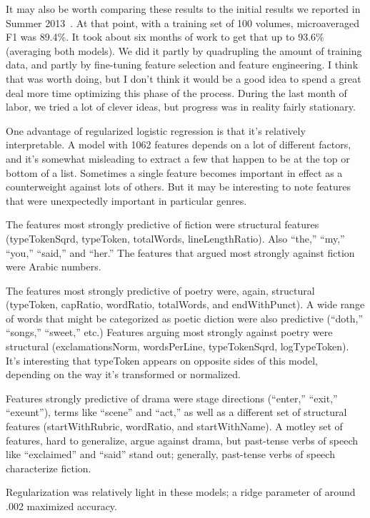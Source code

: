 \documentclass[paper=a4, fontsize=12pt]{scrartcl}
\numberwithin{equation}{section}		%
\numberwithin{figure}{section}			%
\numberwithin{table}{section}				%
\begin{document}
It may also be worth comparing these results to the initial results we reported in Summer 2013~\cite{underwood:mutable}. At that point, with a training set of 100 volumes, microaveraged F1 was 89.4\%. It took about six months of work to get that up to 93.6\% (averaging both models). We did it partly by quadrupling the amount of training data, and partly by fine-tuning feature selection and feature engineering. I think that was worth doing, but I don't think it would be a good idea to spend a great deal more time optimizing this phase of the process. During the last month of labor, we tried a lot of clever ideas, but progress was in reality fairly stationary.

One advantage of regularized logistic regression is that it's relatively interpretable. A model with 1062 features depends on a lot of different factors, and it's somewhat misleading to extract a few that happen to be at the top or bottom of a list. Sometimes a single feature becomes important in effect as a counterweight against lots of others. But it may be interesting to note features that were unexpectedly important in particular genres.

The features most strongly predictive of fiction were structural features (typeTokenSqrd, typeToken, totalWords, lineLengthRatio). Also ``the,'' ``my,'' ``you,'' ``said,'' and ``her.'' The features that argued most strongly against fiction were Arabic numbers.

The features most strongly predictive of poetry were, again, structural (typeToken, capRatio, wordRatio, totalWords, and endWithPunct). A wide range of words that might be categorized as poetic diction were also predictive (``doth,'' ``songs,'' ``sweet,'' etc.) Features arguing most strongly against poetry were structural (exclamationsNorm, wordsPerLine, typeTokenSqrd, logTypeToken). It's interesting that typeToken appears on opposite sides of this model, depending on the way it's transformed or normalized.

Features strongly predictive of drama were stage directions (``enter,'' ``exit,'' ``exeunt''), terms like ``scene'' and ``act,'' as well as a different set of structural features (startWithRubric, wordRatio, and startWithName). A motley set of features, hard to generalize, argue against drama, but past-tense verbs of speech like ``exclaimed'' and ``said'' stand out; generally, past-tense verbs of speech characterize fiction.

Regularization was relatively light in these models; a ridge parameter of around .002 maximized accuracy.
\end{document}
